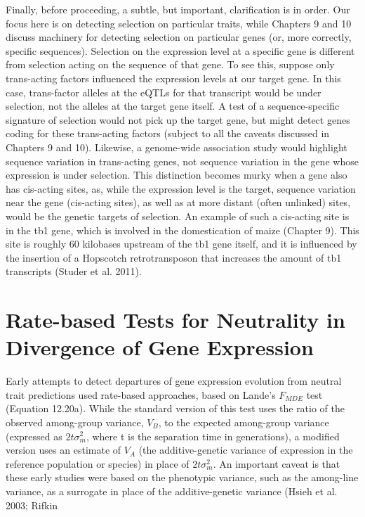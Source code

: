 \documentclass{article}
\begin{document}
Finally, before proceeding, a subtle, but important, clarification is in order. Our focus here is on detecting selection on particular traits, while Chapters 9 and 10 discuss machinery for detecting selection on particular genes (or, more correctly, specific sequences). Selection on the expression level at a specific gene is different from selection acting on the sequence of that gene. To see this, suppose only trans-acting factors influenced the expression levels at our target gene. In this case, trans-factor alleles at the eQTLs for that transcript would be under selection, not the alleles at the target gene itself. A test of a sequence-specific signature of selection would not pick up the target gene, but might detect genes coding for these trans-acting factors (subject to all the caveats discussed in Chapters 9 and 10). Likewise, a genome-wide association study would highlight sequence variation in trans-acting genes, not sequence variation in the gene whose expression is under selection. This distinction becomes murky when a gene also has cis-acting sites, as, while the expression level is the target, sequence variation near the gene (cis-acting sites), as well as at more distant (often unlinked) sites, would be the genetic targets of selection. An example of such a cis-acting site is in the tb1 gene, which is involved in the domestication of maize (Chapter 9). This site is roughly 60 kilobases upstream of the tb1 gene itself, and it is influenced by the insertion of a Hopscotch retrotransposon that increases the amount of tb1 transcripts (Studer et al. 2011).

\section{Rate-based Tests for Neutrality in Divergence of Gene Expression}
Early attempts to detect departures of gene expression evolution from neutral trait predictions used rate-based approaches, based on Lande's  $ F_{MDE} $ test (Equation 12.20a). While the standard version of this test uses the ratio of the observed among-group variance,  $ V_{B} $, to the expected among-group variance (expressed as  $ 2t\sigma_{m}^{2} $, where t is the separation time in generations), a modified version uses an estimate of  $ V_{A} $ (the additive-genetic variance of expression in the reference population or species) in place of  $ 2t\sigma_{m}^{2} $. An important caveat is that these early studies were based on the phenotypic variance, such as the among-line variance, as a surrogate in place of the additive-genetic variance (Hsieh et al. 2003; Rifkin
\end{document}
